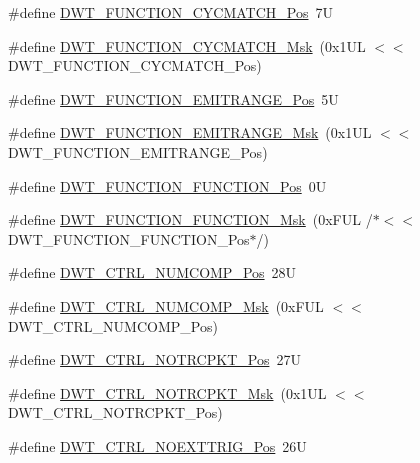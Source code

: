 \begin{DoxyCompactItemize}
\item 
\#define \hyperlink{group___c_m_s_i_s___d_w_t_ga4b65d79ca37ae8010b4a726312413efd}{D\+W\+T\+\_\+\+F\+U\+N\+C\+T\+I\+O\+N\+\_\+\+C\+Y\+C\+M\+A\+T\+C\+H\+\_\+\+Pos}~7U
\item 
\#define \hyperlink{group___c_m_s_i_s___d_w_t_ga8e2ed09bdd33a8f7f7ce0444f5f3bb25}{D\+W\+T\+\_\+\+F\+U\+N\+C\+T\+I\+O\+N\+\_\+\+C\+Y\+C\+M\+A\+T\+C\+H\+\_\+\+Msk}~(0x1\+U\+L $<$$<$ D\+W\+T\+\_\+\+F\+U\+N\+C\+T\+I\+O\+N\+\_\+\+C\+Y\+C\+M\+A\+T\+C\+H\+\_\+\+Pos)
\item 
\#define \hyperlink{group___c_m_s_i_s___d_w_t_ga41d5b332216baa8d29561260a1b85659}{D\+W\+T\+\_\+\+F\+U\+N\+C\+T\+I\+O\+N\+\_\+\+E\+M\+I\+T\+R\+A\+N\+G\+E\+\_\+\+Pos}~5U
\item 
\#define \hyperlink{group___c_m_s_i_s___d_w_t_gad46dd5aba29f2e28d4d3f50b1d291f41}{D\+W\+T\+\_\+\+F\+U\+N\+C\+T\+I\+O\+N\+\_\+\+E\+M\+I\+T\+R\+A\+N\+G\+E\+\_\+\+Msk}~(0x1\+U\+L $<$$<$ D\+W\+T\+\_\+\+F\+U\+N\+C\+T\+I\+O\+N\+\_\+\+E\+M\+I\+T\+R\+A\+N\+G\+E\+\_\+\+Pos)
\item 
\#define \hyperlink{group___c_m_s_i_s___d_w_t_ga5797b556edde2bbaa4d33dcdb1a891bb}{D\+W\+T\+\_\+\+F\+U\+N\+C\+T\+I\+O\+N\+\_\+\+F\+U\+N\+C\+T\+I\+O\+N\+\_\+\+Pos}~0U
\item 
\#define \hyperlink{group___c_m_s_i_s___d_w_t_ga3b2cda708755ecf5f921d08b25d774d1}{D\+W\+T\+\_\+\+F\+U\+N\+C\+T\+I\+O\+N\+\_\+\+F\+U\+N\+C\+T\+I\+O\+N\+\_\+\+Msk}~(0x\+F\+U\+L /$\ast$$<$$<$ D\+W\+T\+\_\+\+F\+U\+N\+C\+T\+I\+O\+N\+\_\+\+F\+U\+N\+C\+T\+I\+O\+N\+\_\+\+Pos$\ast$/)
\item 
\#define \hyperlink{group___c_m_s_i_s___d_w_t_gaac44b9b7d5391a7ffef129b7f6c84cd7}{D\+W\+T\+\_\+\+C\+T\+R\+L\+\_\+\+N\+U\+M\+C\+O\+M\+P\+\_\+\+Pos}~28U
\item 
\#define \hyperlink{group___c_m_s_i_s___d_w_t_gaa3d37d68c2ba73f2026265584c2815e7}{D\+W\+T\+\_\+\+C\+T\+R\+L\+\_\+\+N\+U\+M\+C\+O\+M\+P\+\_\+\+Msk}~(0x\+F\+U\+L $<$$<$ D\+W\+T\+\_\+\+C\+T\+R\+L\+\_\+\+N\+U\+M\+C\+O\+M\+P\+\_\+\+Pos)
\item 
\#define \hyperlink{group___c_m_s_i_s___d_w_t_gaa82840323a2628e7f4a2b09b74fa73fd}{D\+W\+T\+\_\+\+C\+T\+R\+L\+\_\+\+N\+O\+T\+R\+C\+P\+K\+T\+\_\+\+Pos}~27U
\item 
\#define \hyperlink{group___c_m_s_i_s___d_w_t_ga04d8bb0a065ca38e2e5f13a97e1f7073}{D\+W\+T\+\_\+\+C\+T\+R\+L\+\_\+\+N\+O\+T\+R\+C\+P\+K\+T\+\_\+\+Msk}~(0x1\+U\+L $<$$<$ D\+W\+T\+\_\+\+C\+T\+R\+L\+\_\+\+N\+O\+T\+R\+C\+P\+K\+T\+\_\+\+Pos)
\item 
\#define \hyperlink{group___c_m_s_i_s___d_w_t_gad997b9026715d5609b5a3b144eca42d0}{D\+W\+T\+\_\+\+C\+T\+R\+L\+\_\+\+N\+O\+E\+X\+T\+T\+R\+I\+G\+\_\+\+Pos}~26U

\end{DoxyCompactItemize}
